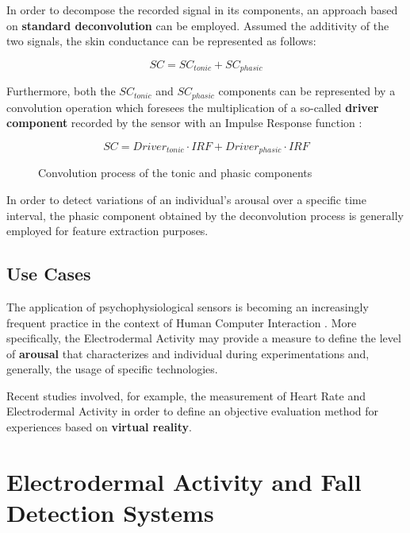 In order to decompose the recorded signal in its components, an approach based on \textbf{standard deconvolution} can be employed. Assumed the additivity of the two signals, the skin conductance can be represented as follows:

\begin{equation}
    SC = SC_{tonic} + SC_{phasic}
\end{equation}

Furthermore, both the $SC_{tonic}$ and $SC_{phasic}$ components can be represented by a convolution operation which foresees the multiplication of a so-called \textbf{driver component} recorded by the sensor with an Impulse Response function \cite{edasvm}:

\begin{figure}[h]
\begin{equation}
SC = Driver_{tonic} \cdot IRF + Driver_{phasic} \cdot IRF
\end{equation}
\caption{Convolution process of the tonic and phasic components}
\label{fig:eda-convolution}
\end{figure}

In order to detect variations of an individual's arousal over a specific time interval, the phasic component obtained by the deconvolution process is generally employed for feature extraction purposes.

\subsection{Use Cases}\label{subsec:eda-usecases}

The application of psychophysiological sensors is becoming an increasingly frequent practice in the context of Human Computer Interaction \cite{eda-hci}. More specifically, the Electrodermal Activity may provide a measure to define the level of \textbf{arousal} that characterizes and individual during experimentations and, generally, the usage of specific technologies.

Recent studies involved, for example, the measurement of Heart Rate and Electrodermal Activity in order to define an objective evaluation method for experiences based on \textbf{virtual reality}.

\section{Electrodermal Activity and Fall Detection Systems}\label{sec:eda-fall-detection}

